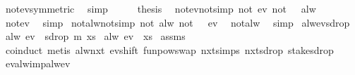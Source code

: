 \begin{isabellebody}
\ not{\isacharunderscore}ev{\isacharbrackleft}symmetric{\isacharbrackright}\ \isamarkupfalse%
\ simp\isanewline
\ \ \isamarkupfalse%
\ \isamarkupfalse%
\ {\isacharquery}thesis\ \isacommand{{\isachardot}}\isamarkupfalse%
\isanewline
{}\isamarkupfalse%
%
\endisatagproof
{\isafoldproof}%
%
\isadelimproof
\isanewline
%
\endisadelimproof
\isanewline
{}\isamarkupfalse%
\ not{\isacharunderscore}ev{\isacharunderscore}not{\isacharbrackleft}simp{\isacharbrackright}{\isacharcolon}\ {\isachardoublequoteopen}not\ {\isacharparenleft}ev\ {\isacharparenleft}not\ {\isasymphi}{\isacharparenright}{\isacharparenright}\ {\isacharequal}\ alw\ {\isasymphi}{\isachardoublequoteclose}\isanewline
%
\isadelimproof
%
\endisadelimproof
%
\isatagproof
{}\isamarkupfalse%
\ not{\isacharunderscore}ev\ \isamarkupfalse%
\ simp%
\endisatagproof
{\isafoldproof}%
%
\isadelimproof
\isanewline
%
\endisadelimproof
\isanewline
{}\isamarkupfalse%
\ not{\isacharunderscore}alw{\isacharunderscore}not{\isacharbrackleft}simp{\isacharbrackright}{\isacharcolon}\ {\isachardoublequoteopen}not\ {\isacharparenleft}alw\ {\isacharparenleft}not\ {\isasymphi}{\isacharparenright}{\isacharparenright}\ {\isacharequal}\ ev\ {\isasymphi}{\isachardoublequoteclose}\isanewline
%
\isadelimproof
%
\endisadelimproof
%
\isatagproof
{}\isamarkupfalse%
\ not{\isacharunderscore}alw\ \isamarkupfalse%
\ simp%
\endisatagproof
{\isafoldproof}%
%
\isadelimproof
\isanewline
%
\endisadelimproof
\isanewline
{}\isamarkupfalse%
\ alw{\isacharunderscore}ev{\isacharunderscore}sdrop{\isacharcolon}\isanewline
{}\ {\isachardoublequoteopen}alw\ {\isacharparenleft}ev\ {\isasymphi}{\isacharparenright}\ {\isacharparenleft}sdrop\ m\ xs{\isacharparenright}{\isachardoublequoteclose}\isanewline
{}\ {\isachardoublequoteopen}alw\ {\isacharparenleft}ev\ {\isasymphi}{\isacharparenright}\ xs{\isachardoublequoteclose}\isanewline
%
\isadelimproof
%
\endisadelimproof
%
\isatagproof
{}\isamarkupfalse%
\ assms\isanewline
{}\isamarkupfalse%
\ coinduct\ {\isacharparenleft}metis\ alw{\isacharunderscore}nxt\ ev{\isacharunderscore}shift\ funpow{\isacharunderscore}swap{}\ nxt{\isachardot}simps\ nxt{\isacharunderscore}sdrop\ stake{\isacharunderscore}sdrop{\isacharparenright}%
\endisatagproof
{\isafoldproof}%
%
\isadelimproof
\isanewline
%
\endisadelimproof
\isanewline
{}\isamarkupfalse%
\ ev{\isacharunderscore}alw{\isacharunderscore}imp{\isacharunderscore}alw{\isacharunderscore}ev{\isacharcolon}\isanewline

\end{isabellebody}
